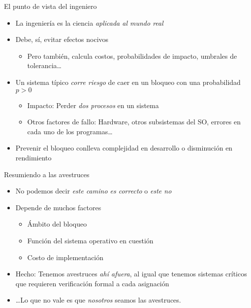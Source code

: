 \documentclass[presentation]{beamer}
\begin{document}
\begin{frame}[label={sec:org0aa919c}]{El punto de vista del ingeniero}
\begin{itemize}
\item La ingeniería es la ciencia \emph{aplicada al mundo real}
\item Debe, sí, evitar efectos nocivos
\begin{itemize}
\item Pero también, calcula costos, probabilidades de impacto, umbrales
de tolerancia\ldots{}
\end{itemize}
\item Un sistema típico \emph{corre riesgo} de caer en un bloqueo con una
probabilidad \(p>0\)
\begin{itemize}
\item Impacto: Perder \emph{dos procesos} en un sistema
\item Otros factores de fallo: Hardware, otros subsistemas del SO,
errores en cada uno de los programas\ldots{}
\end{itemize}
\item Prevenir el bloqueo conlleva complejidad en desarrollo o disminución
en rendimiento
\end{itemize}
\end{frame}

\begin{frame}[label={sec:org137b697}]{Resumiendo a las avestruces}
\begin{itemize}
\item No podemos decir \emph{este camino es correcto} o \emph{este no}
\item Depende de muchos factores
\begin{itemize}
\item Ámbito del bloqueo
\item Función del sistema operativo en cuestión
\item Costo de implementación
\end{itemize}
\item Hecho: Tenemos avestruces \emph{ahí afuera}, al igual que tenemos
sistemas críticos que requieren verificación formal a cada
asignación
\item \ldots{}Lo que no vale es que \emph{nosotros} seamos las avestruces.
\end{itemize}
\end{frame}
\end{document}
